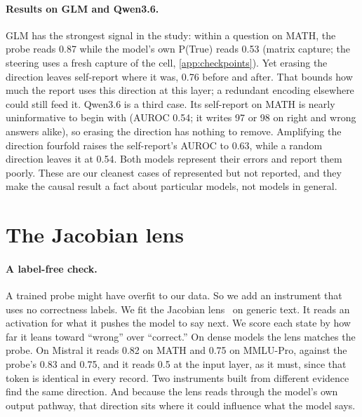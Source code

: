 \documentclass{article}
\begin{document}
\paragraph{Results on GLM and Qwen3.6.}
GLM has the strongest signal in the study: within a question on MATH, the probe reads 0.87 while the model's own P(True) reads 0.53 (matrix capture; the steering uses a fresh capture of the cell, \cref{app:checkpoints}).
Yet erasing the direction leaves self-report where it was, 0.76 before and after.
That bounds how much the report uses this direction at this layer; a redundant encoding elsewhere could still feed it.
Qwen3.6 is a third case.
Its self-report on MATH is nearly uninformative to begin with (AUROC 0.54; it writes 97 or 98 on right and wrong answers alike), so erasing the direction has nothing to remove.
Amplifying the direction fourfold raises the self-report's AUROC to 0.63, while a random direction leaves it at 0.54.
Both models represent their errors and report them poorly.
These are our cleanest cases of represented but not reported, and they make the causal result a fact about particular models, not models in general.

\section{The Jacobian lens}
\label{sec:lens}

\paragraph{A label-free check.}
A trained probe might have overfit to our data.
So we add an instrument that uses no correctness labels.
We fit the Jacobian lens~\citep{gurnee2026workspace} on generic text.
It reads an activation for what it pushes the model to say next.
We score each state by how far it leans toward ``wrong'' over ``correct.''
On dense models the lens matches the probe.
On Mistral it reads 0.82 on MATH and 0.75 on MMLU-Pro, against the probe's 0.83 and 0.75, and it reads 0.5 at the input layer, as it must, since that token is identical in every record.
Two instruments built from different evidence find the same direction.
And because the lens reads through the model's own output pathway, that direction sits where it could influence what the model says.
\end{document}
